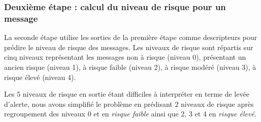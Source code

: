 \subsubsection{Deuxième étape : calcul du niveau de risque pour un message}\label{etape2}

La seconde étape utilise les sorties de la première étape comme descripteurs pour prédire le niveau de risque des messages. Les niveaux de risque sont répartis sur cinq niveaux représentant les messages non à risque (niveau 0), présentant un ancien risque (niveau 1), à risque faible (niveau 2), à risque modéré (niveau 3), à risque élevé (niveau 4).

Les $5$ niveaux de risque en sortie étant difficiles à interpréter en terme de levée d'alerte, nous avons simplifié le problème en prédisant $2$ niveaux de risque après regroupement des niveaux 0 et en \textit{risque faible} ainsi que 2, 3 et 4 en \textit{risque élevé}.